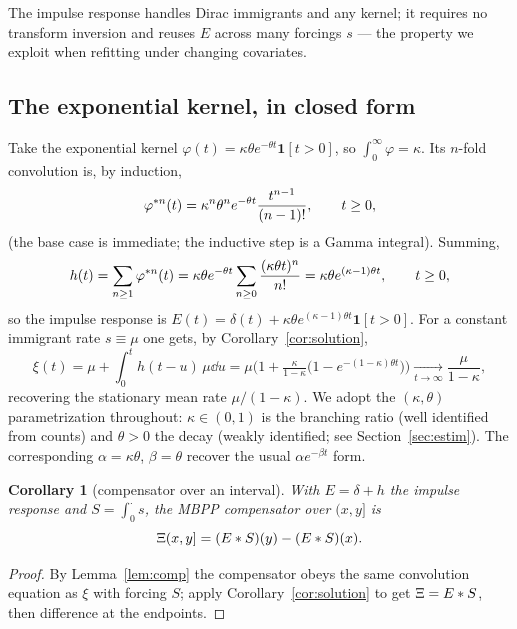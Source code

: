 \documentclass[11pt]{article}
\theoremstyle{plain}
\newtheorem{corollary}[theorem]{Corollary}
\theoremstyle{definition}
\theoremstyle{remark}
\newcommand{\ind}[1]{\mathbf{1}\!\left[#1\right]}
\begin{document}
The impulse response handles Dirac immigrants and any kernel; it requires no
transform inversion and reuses $E$ across many forcings $s$ --- the property we
exploit when refitting under changing covariates.

\subsection{The exponential kernel, in closed form}
\label{sec:exp}

Take the exponential kernel
$\varphi(t)=\kappa\theta e^{-\theta t}\ind{t>0}$, so
$\int_0^\infty\varphi=\kappa$. Its $n$-fold convolution is, by induction,
\[
\varphi^{\ast n}(t)=\kappa^n\theta^n e^{-\theta t}\frac{t^{n-1}}{(n-1)!},\qquad t\ge0,
\]
(the base case is immediate; the inductive step is a Gamma integral). Summing,
\begin{equation}
h(t)=\sum_{n\ge1}\varphi^{\ast n}(t)
=\kappa\theta e^{-\theta t}\sum_{n\ge0}\frac{(\kappa\theta t)^n}{n!}
=\kappa\theta e^{(\kappa-1)\theta t},\qquad t\ge0,
\label{eq:hexp}
\end{equation}
so the impulse response is $E(t)=\delta(t)+\kappa\theta e^{(\kappa-1)\theta t}
\ind{t>0}$. For a constant immigrant rate $s\equiv\mu$ one gets, by
Corollary~\ref{cor:solution},
\[
\xi(t)=\mu+\int_0^t h(t-u)\,\mu\dd u
=\mu\Big(1+\tfrac{\kappa}{1-\kappa}\big(1-e^{-(1-\kappa)\theta t}\big)\Big)
\xrightarrow[t\to\infty]{}\frac{\mu}{1-\kappa},
\]
recovering the stationary mean rate $\mu/(1-\kappa)$. We adopt the
$(\kappa,\theta)$ parametrization throughout: $\kappa\in(0,1)$ is the branching
ratio (well identified from counts) and $\theta>0$ the decay (weakly identified;
see Section~\ref{sec:estim}). The corresponding $\alpha=\kappa\theta$,
$\beta=\theta$ recover the usual $\alpha e^{-\beta t}$ form.

\begin{corollary}[compensator over an interval]
\label{cor:compint}
With $E=\delta+h$ the impulse response and $S=\int_0^\cdot s$, the MBPP
compensator over $(x,y]$ is
\begin{equation}
\Xi(x,y]=(E\ast S)(y)-(E\ast S)(x).
\label{eq:compint}
\end{equation}
\end{corollary}
\begin{proof}
By Lemma~\ref{lem:comp} the compensator obeys the same convolution equation as
$\xi$ with forcing $S$; apply Corollary~\ref{cor:solution} to get
$\Xi=E\ast S$, then difference at the endpoints.
\end{proof}
\end{document}
